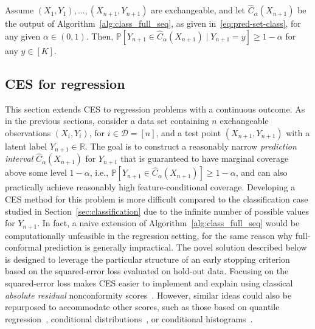 \begin{theorem}\label{thm:class_full}
Assume $(X_{1},Y_{1}), \ldots, (X_{n+1},Y_{n+1})$ are exchangeable, and let $\hat{C}_{\alpha}(X_{n+1})$ be the output of Algorithm~\ref{alg:class_full_seq}, as given in~\eqref{eq:pred-set-class}, for any given $\alpha \in (0,1)$.
Then, $\mathbb{P}[Y_{n+1} \in \hat{C}_{\alpha}(X_{n+1}) \mid Y_{n+1} = y] \geq 1-\alpha$ for any $y \in [K]$.
\end{theorem}


\subsection{CES for regression} \label{sec:regression}

This section extends CES to regression problems with a continuous outcome.
As in the previous sections, consider a data set containing $n$ exchangeable observations $(X_i,Y_i)$, for $i \in \mathcal{D} = [n]$, and a test point $(X_{n+1}, Y_{n+1})$ with a latent label $Y_{n+1} \in \mathbb{R}$. The goal is to construct a reasonably narrow {\em prediction interval} $\hat{C}_{\alpha}(X_{n+1})$ for $Y_{n+1}$ that is guaranteed to have marginal coverage above some level $1-\alpha$, i.e., $\mathbb{P}[Y_{n+1} \in \hat{C}_{\alpha}(X_{n+1}) ] \geq 1-\alpha$, and can also practically achieve reasonably high feature-conditional coverage.
Developing a CES method for this problem is more difficult compared to the classification case studied in Section~\ref{sec:classification} due to the infinite number of possible values for $Y_{n+1}$. In fact, a naive extension of Algorithm~\ref{alg:class_full_seq} would be computationally unfeasible in the regression setting, for the same reason why full-conformal prediction \cite{vovk2005algorithmic} is generally impractical.
The novel solution described below is designed to leverage the particular structure of an early stopping criterion based on the squared-error loss evaluated on hold-out data. Focusing on the squared-error loss makes CES easier to implement and explain using classical {\em absolute residual} nonconformity scores~\cite{vovk2005algorithmic,lei2016RegressionPS}.
However, similar ideas could also be repurposed to accommodate other scores, such as those based on quantile regression~\cite{romano2019conformalized}, conditional distributions~\cite{chernozhukov2019distributional,izbicki2019flexible}, or conditional histograms~\cite{sesia2021conformal}.

